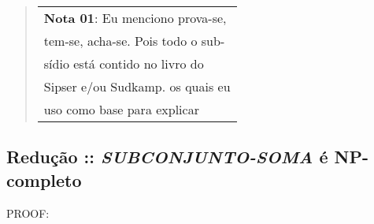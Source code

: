 \documentclass[12pt, a4paper]{article}
\begin{document}
\begin{quote}
  \flushright
    \begin{tabular}{|l}
    \textbf{Nota 01}: Eu menciono prova-se,\\
    tem-se, acha-se. Pois todo o sub-\\
    sídio está contido no livro do\\
    Sipser e/ou Sudkamp. os quais eu\\
    uso como base para explicar\\
  \end{tabular}
\end{quote}

\pagebreak
\subsection{Redução :: \textit{SUBCONJUNTO-SOMA} é \textbf{NP-completo}}

\begin{center}\begin{Huge}PROOF:\end{Huge}\end{center}
\end{document}
